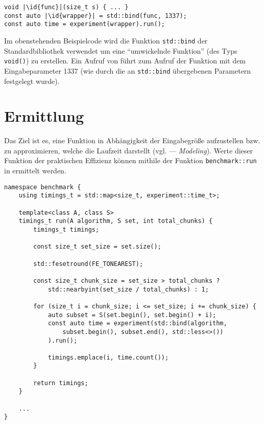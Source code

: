 \begin{lstlisting}[numbers=none]
void |\id{func}|(size_t s) { ... }
const auto |\id{wrapper}| = std::bind(func, 1337);
const auto time = experiment(wrapper).run();
\end{lstlisting}

Im obenstehenden Beispielcode wird die Funktion \lstinline{std::bind} der Standardbibliothek verwendet um eine \enquote{umwickelnde Funktion}  (des Typs \lstinline{void()}) zu erstellen. Ein Aufruf von  führt zum Aufruf der Funktion  mit dem Eingabeparameter 1337 (wie durch die an \lstinline{std::bind} übergebenen Parametern festgelegt wurde).

\section{Ermittlung}
\label{sec:funkterm}

Das Ziel ist es, eine Funktion in Abhängigkeit der Eingabegröße aufzustellen bzw. zu approximieren, welche die Laufzeit darstellt (vgl. \cite[37]{mcg2012} --- \emph{Modeling}). Werte dieser Funktion der praktischen Effizienz können mithile der Funktion \lstinline{benchmark::run} in  ermittelt werden.

\begin{lstlisting}[label=lst:benchmark, caption={Implementation einer Funktion zur Ermittlung der praktischen Effizienz eines Algorithmus mit einer bestimmenten Eingabemenge.}]
namespace benchmark {
	using timings_t = std::map<size_t, experiment::time_t>;

	template<class A, class S>
	timings_t run(A algorithm, S set, int total_chunks) {
		timings_t timings;

		const size_t set_size = set.size();

		std::fesetround(FE_TONEAREST);

		const size_t chunk_size = set_size > total_chunks ?
			std::nearbyint(set_size / total_chunks) : 1;

		for (size_t i = chunk_size; i <= set_size; i += chunk_size) {
			auto subset = S(set.begin(), set.begin() + i);
			const auto time = experiment(std::bind(algorithm,
				subset.begin(), subset.end(), std::less<>())
			).run();

			timings.emplace(i, time.count());
		}

		return timings;
	}
	
	...
}
\end{lstlisting}

